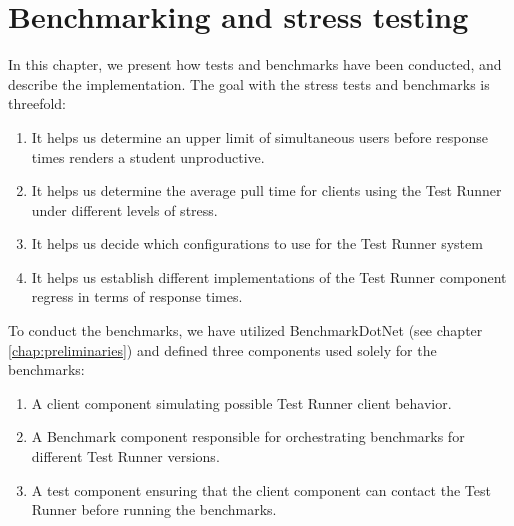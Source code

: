 \section{Benchmarking and stress testing} \label{chap:Benchmarking}
In this chapter, we present how tests and benchmarks have been conducted, and describe the implementation. 
The goal with the stress tests and benchmarks is threefold: 
\begin{enumerate}
\item It helps us determine an upper limit of simultaneous users before response times renders a student unproductive.
\item It helps us determine the average pull time for clients using the Test Runner under different levels of stress.
\item It helps us decide which configurations to use for the Test Runner system
\item It helps us establish different implementations of the Test Runner component regress in terms of response times.
\end{enumerate}
To conduct the benchmarks, we have utilized BenchmarkDotNet (see chapter \ref{chap:preliminaries}) and defined three components used solely for the benchmarks:
\begin{enumerate}
  \item A client component simulating possible Test Runner client behavior.
  \item A Benchmark component responsible for orchestrating benchmarks for different Test Runner versions.
  \item A test component ensuring that the client component can contact the Test Runner before running the benchmarks.
\end{enumerate}


